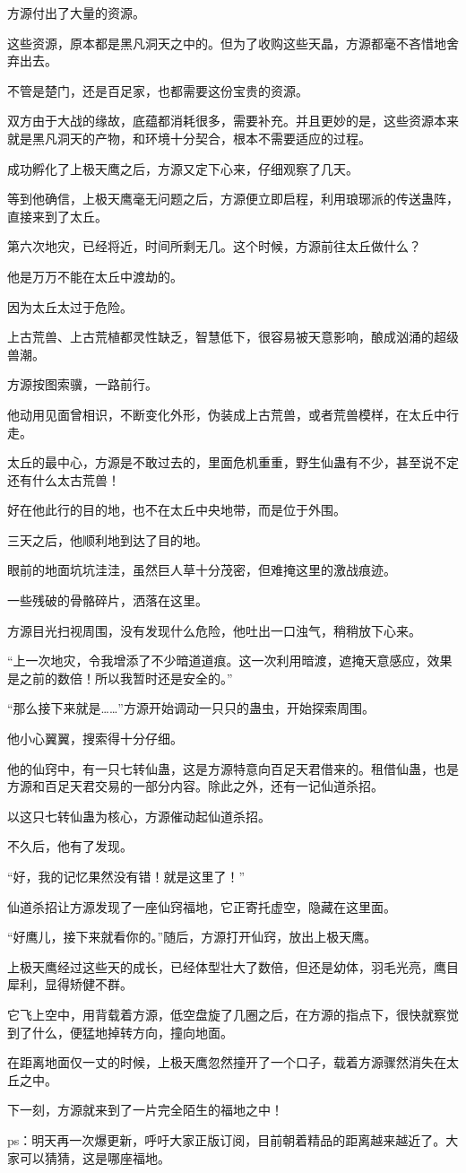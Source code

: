 \begin{this_body}
方源付出了大量的资源。

这些资源，原本都是黑凡洞天之中的。但为了收购这些天晶，方源都毫不吝惜地舍弃出去。

不管是楚门，还是百足家，也都需要这份宝贵的资源。

双方由于大战的缘故，底蕴都消耗很多，需要补充。并且更妙的是，这些资源本来就是黑凡洞天的产物，和环境十分契合，根本不需要适应的过程。

成功孵化了上极天鹰之后，方源又定下心来，仔细观察了几天。

等到他确信，上极天鹰毫无问题之后，方源便立即启程，利用琅琊派的传送蛊阵，直接来到了太丘。

第六次地灾，已经将近，时间所剩无几。这个时候，方源前往太丘做什么？

他是万万不能在太丘中渡劫的。

因为太丘太过于危险。

上古荒兽、上古荒植都灵性缺乏，智慧低下，很容易被天意影响，酿成汹涌的超级兽潮。

方源按图索骥，一路前行。

他动用见面曾相识，不断变化外形，伪装成上古荒兽，或者荒兽模样，在太丘中行走。

太丘的最中心，方源是不敢过去的，里面危机重重，野生仙蛊有不少，甚至说不定还有什么太古荒兽！

好在他此行的目的地，也不在太丘中央地带，而是位于外围。

三天之后，他顺利地到达了目的地。

眼前的地面坑坑洼洼，虽然巨人草十分茂密，但难掩这里的激战痕迹。

一些残破的骨骼碎片，洒落在这里。

方源目光扫视周围，没有发现什么危险，他吐出一口浊气，稍稍放下心来。

“上一次地灾，令我增添了不少暗道道痕。这一次利用暗渡，遮掩天意感应，效果是之前的数倍！所以我暂时还是安全的。”

“那么接下来就是……”方源开始调动一只只的蛊虫，开始探索周围。

他小心翼翼，搜索得十分仔细。

他的仙窍中，有一只七转仙蛊，这是方源特意向百足天君借来的。租借仙蛊，也是方源和百足天君交易的一部分内容。除此之外，还有一记仙道杀招。

以这只七转仙蛊为核心，方源催动起仙道杀招。

不久后，他有了发现。

“好，我的记忆果然没有错！就是这里了！”

仙道杀招让方源发现了一座仙窍福地，它正寄托虚空，隐藏在这里面。

“好鹰儿，接下来就看你的。”随后，方源打开仙窍，放出上极天鹰。

上极天鹰经过这些天的成长，已经体型壮大了数倍，但还是幼体，羽毛光亮，鹰目犀利，显得矫健不群。

它飞上空中，用背载着方源，低空盘旋了几圈之后，在方源的指点下，很快就察觉到了什么，便猛地掉转方向，撞向地面。

在距离地面仅一丈的时候，上极天鹰忽然撞开了一个口子，载着方源骤然消失在太丘之中。

下一刻，方源就来到了一片完全陌生的福地之中！

ps：明天再一次爆更新，呼吁大家正版订阅，目前朝着精品的距离越来越近了。大家可以猜猜，这是哪座福地。

\end{this_body}

